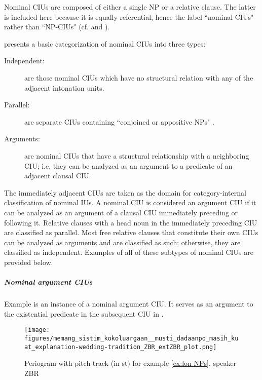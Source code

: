 
Nominal CIUs are composed of either a single NP or a relative clause. The latter is included here because it is equally referential, hence the label ``nominal CIUs" rather than ``NP-CIUs" (cf. \citealt[13]{Croft_2007} and \citealt[79]{Tao_1996}).

\citet[13]{Croft_2007} presents a basic categorization of nominal CIUs into three types:



\begin{description}
	\item [{Independent}:] are those nominal CIUs which have no structural relation with any of the adjacent intonation units.
	\item [{Parallel}:] are separate CIUs containing ``conjoined  or  appositive  NPs" \citep[13]{Croft_2007}.
	\item [{Arguments}:] are nominal CIUs that have a structural relationship with a neighboring CIU; i.e. they can be analyzed as an argument to a predicate of an adjacent clausal CIU.
\end{description}


The immediately adjacent CIUs are taken as the domain for category-internal classification of nominal IUs. A nominal CIU is considered an argument CIU if it can be analyzed as an argument of a clausal CIU immediately preceding or following it. Relative clauses with a head noun in the immediately preceding CIU are classified as parallel. Most free relative clauses that constitute their own CIUs can be analyzed as arguments and are classified as such; otherwise, they are classified as independent. Examples of all of these subtypes of nominal CIUs are provided below.





\subparagraph{Nominal argument CIUs}
\label{sec:lone-nps}


Example  is an instance of a nominal argument CIU. It serves as an argument  to the existential predicate in the subsequent CIU in .

\begin{figure}
	\texttt{[image: figures/memang\_sistim\_kokoluargaan\_\_musti\_dadaanpo\_masih\_kuat\_explanation-wedding-tradition\_ZBR\_extZBR\_plot.png]}
	\caption{Periogram with pitch track (in st) for example \ref{ex:lon NPs}, speaker ZBR}
	\label{pitch:lon NPs}
\end{figure}



